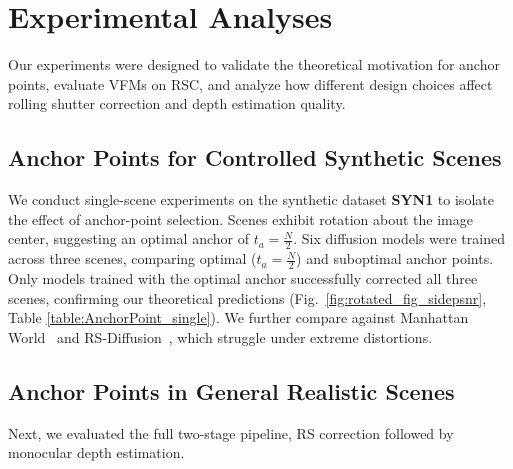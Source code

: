 \section{Experimental Analyses}
\label{sec:experiments}

Our experiments were designed to validate the theoretical motivation for anchor points, evaluate VFMs on RSC, and analyze how different design choices affect rolling shutter correction and depth estimation quality. 

\subsection{Anchor Points for Controlled Synthetic Scenes}

We conduct single-scene experiments on the synthetic dataset \textbf{SYN1} to isolate the effect of anchor-point selection. Scenes exhibit rotation about the image center, suggesting an optimal anchor of $t_a=\frac{N}{2}$. Six diffusion models were trained across three scenes, comparing optimal ($t_a = \frac{N}{2}$) and suboptimal anchor points. Only models trained with the optimal anchor successfully corrected all three scenes, confirming our theoretical predictions (Fig.~\ref{fig:rotated_fig_sidepsnr}, Table \ref{table:AnchorPoint_single}). We further compare against Manhattan World~\cite{Manhattan} and RS-Diffusion~\cite{RS-Diffusion}, which struggle under extreme distortions.








\subsection{Anchor Points in General Realistic Scenes}
Next, we evaluated the full two-stage pipeline, RS correction followed by monocular depth estimation. 

